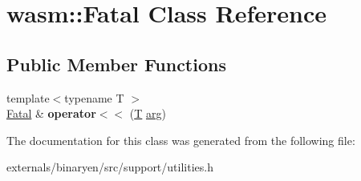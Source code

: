 \hypertarget{classwasm_1_1_fatal}{}\section{wasm\+:\+:Fatal Class Reference}
\label{classwasm_1_1_fatal}
\subsection*{Public Member Functions}
\begin{DoxyCompactItemize}
\item 
\mbox{\label{classwasm_1_1_fatal_a76d88e607e1a0e32142af789344b8bfe}} 
{\footnotesize template$<$typename T $>$ }\\\mbox{\hyperlink{classwasm_1_1_fatal}{Fatal}} \& {\bfseries operator$<$$<$} (\mbox{\hyperlink{struct_t}{T}} \mbox{\hyperlink{unionarg}{arg}})
\end{DoxyCompactItemize}


The documentation for this class was generated from the following file\+:\begin{DoxyCompactItemize}
\item 
externals/binaryen/src/support/utilities.\+h\end{DoxyCompactItemize}

